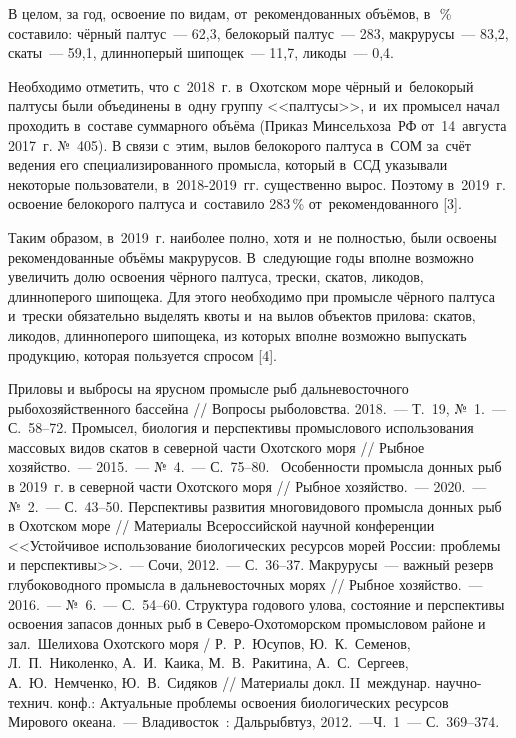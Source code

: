 В целом, за год, освоение по видам, от~рекомендованных объёмов, в~\,\% составило: чёрный палтус~--- 62,3, белокорый палтус~--- 283, макрурусы~--- 83,2, скаты~--- 59,1, длинноперый шипощек~--- 11,7, ликоды~--- 0,4.

Необходимо отметить, что с~2018~г. в~Охотском море чёрный и~белокорый палтусы были объединены в~одну группу <<палтусы>>, и~их промысел начал проходить в~составе суммарного объёма (Приказ Минсельхоза~РФ от~14~августа 2017~г. №~405). В связи с~этим, вылов белокорого палтуса в~СОМ за~счёт ведения его специализированного промысла, который в~ССД указывали некоторые пользователи, в~2018-2019~гг. существенно вырос. Поэтому в~2019~г. освоение белокорого палтуса и~составило 283\,\% от~рекомендованного [3].

Таким образом, в~2019~г. наиболее полно, хотя и~не полностью, были освоены рекомендованные объёмы макрурусов. В~следующие годы вполне возможно увеличить долю освоения чёрного палтуса, трески, скатов, ликодов, длинноперого шипощека. Для этого необходимо при промысле чёрного палтуса и~трески обязательно выделять квоты и~на вылов объектов прилова: скатов, ликодов, длинноперого шипощека, из которых вполне возможно выпускать продукцию, которая пользуется спросом [4].

\begin{thebibliography}{99}

\bibitem{}
 Приловы и выбросы на ярусном промысле рыб дальневосточного рыбохозяйственного бассейна // Вопросы рыболовства. 2018.~--- Т.~19, №~1.~--- С.~58--72.
\bibitem{}
 Промысел, биология и перспективы промыслового использования массовых видов скатов в северной части Охотского моря // Рыбное хозяйство.~--- 2015.~--- №~4.~--- С.~75--80.
\bibitem{}
 Особенности промысла донных рыб в 2019~г. в северной части Охотского моря // Рыбное хозяйство.~--- 2020.~--- №~2.~--- С.~43--50.
\bibitem{}
 Перспективы развития многовидового промысла донных рыб в Охотском море // Материалы Всероссийской научной конференции <<Устойчивое использование биологических ресурсов морей России: проблемы и перспективы>>.~--- Сочи, 2012.~--- С.~36--37.
\bibitem{}
 Макрурусы~--- важный резерв глубоководного промысла в дальневосточных морях // Рыбное хозяйство.~--- 2016.~--- №~6.~--- С.~54--60.
\bibitem{}
 Структура годового улова, состояние и перспективы освоения запасов донных рыб в Северо-Охотоморском промысловом районе и зал.~Шелихова Охотского моря / Р.~Р.~Юсупов, Ю.~К.~Семенов, Л.~П.~Николенко, А.~И.~Каика, М.~В.~Ракитина, А.~С.~Сергеев, А.~Ю.~Немченко, Ю.~В.~Сидяков // Материалы докл. II~междунар. научно-технич. конф.: Актуальные проблемы освоения биологических ресурсов Мирового океана.~--- Владивосток~: Дальрыбвтуз, 2012.~---Ч.~1~--- С.~369--374.
\end{thebibliography}
